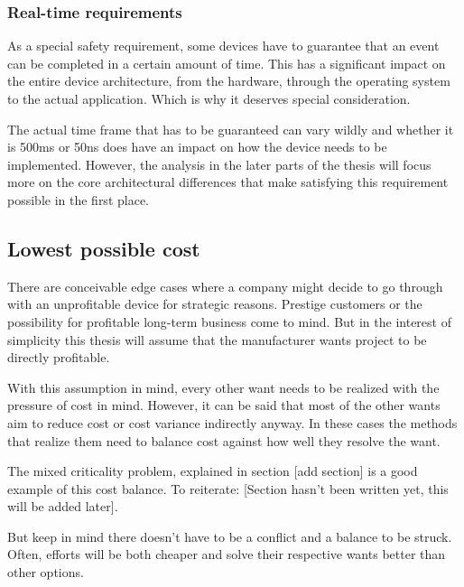 \subsubsection{Real-time requirements}
As a special safety requirement, some devices have to guarantee that an event can be completed in a certain amount of time. This has a significant impact on the entire device architecture, from the hardware, through the operating system to the actual application. Which is why it deserves special consideration.

The actual time frame that has to be guaranteed can vary wildly and whether it is 500ms or 50ns does have an impact on how the device needs to be implemented. However, the analysis in the later parts of the thesis will focus more on the core architectural differences that make satisfying this requirement possible in the first place. 

\subsection{Lowest possible cost}
There are conceivable edge cases where a company might decide to go through with an unprofitable device for strategic reasons. Prestige customers or the possibility for profitable long-term business come to  mind. But in the interest of simplicity this thesis will assume that the manufacturer wants project to be directly profitable.

With this assumption in mind, every other want needs to be realized with the pressure of cost in mind. However, it can be said that most of the other wants aim to reduce cost or cost variance indirectly anyway. In these cases the methods that realize them need to balance cost against how well they resolve the want.

The mixed criticality problem, explained in section [add section] is a good example of this cost balance. To reiterate: [Section hasn't been written yet, this will be added later]. 

But keep in mind there doesn't have to be a conflict and a balance to be struck. Often, efforts will be both cheaper and solve their respective wants better than other options.

